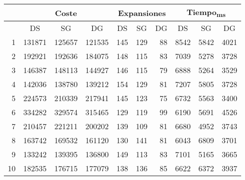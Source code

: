 \documentclass{article}
\begin{document}
  \begin{center}
    \begin{tabular}{ | r | r | r | r | r | r | r | r | r | r | }
      \hline
      \rowcolor{DarkGrey}
      & \multicolumn{3}{|c|}{Coste} & \multicolumn{3}{c|}{Expansiones} & \multicolumn{3}{|c|}{Tiempo\textsubscript{ms}} \\ \hline
      \rowcolor{DarkGrey}
      \multicolumn{1}{|c|}{Réplica} & \multicolumn{1}{|c|}{DS} & \multicolumn{1}{|c|}{SG} & \multicolumn{1}{|c|}{DG} & \multicolumn{1}{|c|}{DS} & \multicolumn{1}{|c|}{SG} & \multicolumn{1}{|c|}{DG} & \multicolumn{1}{|c|}{DS} & \multicolumn{1}{|c|}{SG} & \multicolumn{1}{|c|}{DG} \\ \hline \hline
      1 & 131871 & 125657 & 121535 & 145 & 129 & 88 & 8542 & 5842 & 4021 \\ \hline
      \rowcolor{LightGrey}
      2 & 192921 & 192636 & 184075 & 148 & 115 & 83 & 7039 & 5278 & 3728 \\ \hline
      3 & 146387 & 148113 & 144927 & 146 & 115 & 79 & 6888 & 5264 & 3529 \\ \hline
      \rowcolor{LightGrey}
      4 & 142036 & 138780 & 139212 & 154 & 129 & 81 & 7207 & 5805 & 3728 \\ \hline
      5 & 224573 & 210339 & 217941 & 145 & 123 & 75 & 6732 & 5563 & 3400 \\ \hline
      \rowcolor{LightGrey}
      6 & 334282 & 329574 & 315465 & 129 & 119 & 99 & 6190 & 5691 & 4526 \\ \hline
      7 & 210457 & 221211 & 200202 & 139 & 109 & 81 & 6680 & 4952 & 3743 \\ \hline
      \rowcolor{LightGrey}
      8 & 163742 & 169532 & 161120 & 130 & 141 & 81 & 6043 & 6809 & 3701 \\ \hline
      9 & 133242 & 139395 & 136800 & 149 & 113 & 83 & 7101 & 5165 & 3665 \\ \hline
      \rowcolor{LightGrey}
      10 & 182535 & 176715 & 177079 & 138 & 136 & 85 & 6622 & 6372 & 3937 \\ \hline
    \end{tabular}
    \label{table:T2}
  \end{center}
\end{document}
